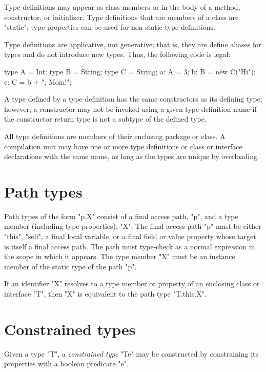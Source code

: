 Type definitions may appear as class members or in the body of a
method, constructor, or initializer.  Type definitions that are
members of a class are \xcd"static"; type properties can be used
for non-static type definitions.

Type definitions are applicative, not generative; that is, they
are define aliases for types and do not introduce new types.
Thus, the following code is legal:
\begin{xten}
type A = Int;
type B = String;
type C = String;
a: A = 3;
b: B = new C("Hi");
c: C = b + ", Mom!";
\end{xten}
A type defined by a type definition
has the same constructors as its defining type; however, a
constructor may not be invoked using a given type definition
name if the constructor return type is not a subtype of the
defined type.

All type definitions are members of their enclosing package or
class.  A compilation unit may have one or more type definitions
or class or interface declarations with the same name, as long
as the types are unique by overloading.

\section{Path types}

Path types of the form \xcd"p.X" consist of a final access path,
\xcd"p", and a type
member (including type properties), \xcd"X".
The final access path \xcd"p" must be either \xcd"this", \xcd"self", a final
local variable, or a final field or value property whose target
is itself a final access path.  The path must type-check 
as a normal expression in the scope in which it appears.
The type member
\xcd"X" must be an instance member of the static type of the
path \xcd"p".

If an identifier \xcd"X" resolves to a type member or property
of an enclosing class or interface \xcd"T", then \xcd"X" is equivalent to
the path type \xcd"T.this.X".

\section{Constrained types}
\label{DepType:DepType}
\label{DepTypes}
        
        Given a type \xcd"T", a {\em constrained type}
        \xcd"T{e}" may be
        constructed by constraining its properties with a
        boolean predicate \xcd"e".


